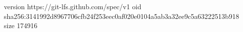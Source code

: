 version https://git-lfs.github.com/spec/v1
oid sha256:3141992d8967706cfb24f253eec0af020e0104a5ab3a32ee9c5a63222513b918
size 174916
